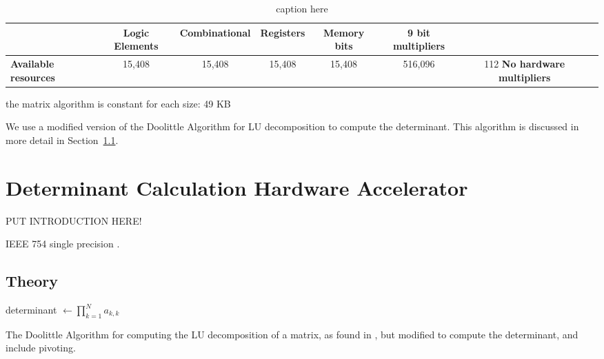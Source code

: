 \documentclass[]{article}
\begin{document}
\begin{table}[tbp]
	\caption{caption here}
	\label{fig:figurename}
	\begin{center}
		\begin{tabular}{l|cccccc}
		\hline

		\hline
			& \textbf{Logic Elements} 	& \textbf{Combinational} 	& \textbf{Registers} 	& \textbf{Memory bits} 	& \textbf{9 bit multipliers} \\

		\hline
			\textbf{Available resources}
			& 15,408 	& 15,408 	& 15,408 	& 15,408 	& 516,096 	& 112
		\hline
			\textbf{No hardware multipliers}
			& 
		\hline

		\hline
		\end{tabular}
	\end{center}
\end{table}


the matrix algorithm is constant for each size: 49 KB


We use a modified version of the Doolittle Algorithm for LU decomposition to compute the determinant. This algorithm is discussed in more detail in Section~\ref{sub:theory}.







\section{Determinant Calculation Hardware Accelerator} %
\label{sec:determinant_calculation_hardware_accelerator}

PUT INTRODUCTION HERE!

IEEE 754 single precision \cite{ieee754}.

\subsection{Theory} %
\label{sub:theory}

\begin{algorithm}[htbp]
	\SetAlgoLined



	determinant $\leftarrow \prod_{k=1}^N a_{k,k}$
	\bigskip

	\caption{The Doolittle Algorithm for computing the LU decomposition of a matrix, as found in \cite{LUgen}, but modified to compute the determinant, and include pivoting.}
	\label{alg:doolittle}
\end{algorithm}
\end{document}
